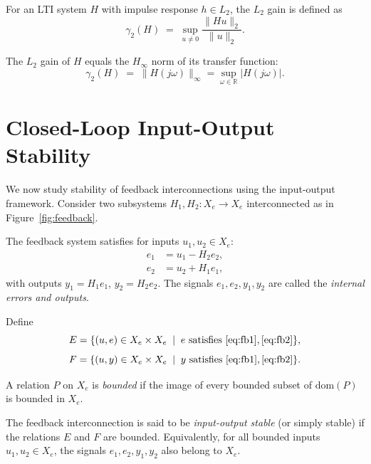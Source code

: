 \begin{definition}[$L_2$ Gain]
For an LTI system $H$ with impulse response $h \in L_2$, the $L_2$ gain is defined as
\[
\gamma_2(H) \;=\; \sup_{u \neq 0} \frac{\|Hu\|_2}{\|u\|_2}.
\]
\end{definition}

\begin{theorem}
The $L_2$ gain of $H$ equals the $H_\infty$ norm of its transfer function:
\[
\gamma_2(H) \;=\; \|H(j\omega)\|_\infty 
= \sup_{\omega \in \mathbb{R}} |H(j\omega)|.
\]
\end{theorem}

\section{Closed-Loop Input-Output Stability}

We now study stability of feedback interconnections using the input-output framework.  
Consider two subsystems $H_1, H_2 : X_e \to X_e$ interconnected as in Figure~\ref{fig:feedback}.

\begin{definition}
The feedback system satisfies for inputs $u_1,u_2 \in X_e$:
\begin{align}
e_1 &= u_1 - H_2 e_2, \label{eq:fb1}\\
e_2 &= u_2 + H_1 e_1, \label{eq:fb2}
\end{align}
with outputs $y_1 = H_1 e_1$, $y_2 = H_2 e_2$.  
The signals $e_1,e_2,y_1,y_2$ are called the \emph{internal errors and outputs}.
\end{definition}

\begin{definition}
Define
\[
E = \{ (u,e) \in X_e \times X_e \;\mid\; e \text{ satisfies } \eqref{eq:fb1}, \eqref{eq:fb2}\},
\]
\[
F = \{ (u,y) \in X_e \times X_e \;\mid\; y \text{ satisfies } \eqref{eq:fb1}, \eqref{eq:fb2}\}.
\]
\end{definition}

\begin{definition}[Boundedness]
A relation $P$ on $X_e$ is \emph{bounded} if the image of every bounded subset of $\mathrm{dom}(P)$ is bounded in $X_e$.
\end{definition}

\begin{definition}
The feedback interconnection is said to be \emph{input-output stable} (or simply stable) if the relations $E$ and $F$ are bounded.  
Equivalently, for all bounded inputs $u_1,u_2 \in X_e$, the signals $e_1,e_2,y_1,y_2$ also belong to $X_e$.
\end{definition}

